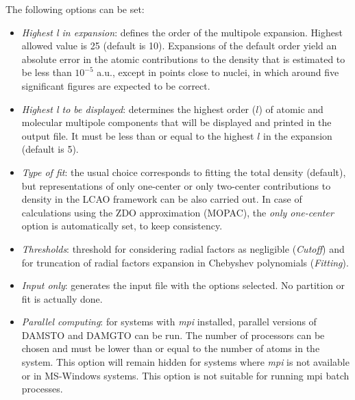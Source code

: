 \documentclass[10pt]{article}
\begin{document}
The following options can be
set:
\renewcommand{\labelitemi}{$-$}
\begin{itemize}
\item {\it Highest l in expansion}: defines the order of the multipole
expansion. Highest allowed value is 25 (default is 10). 
Expansions of the default order yield an absolute error in the atomic
contributions to the density that is estimated to be less than $10^{-5}$ a.u., except in points close
to nuclei, in which around five significant figures are expected to be correct.

\item {\it Highest l to be displayed}: determines the highest order ($l$) of atomic and molecular
multipole components that will be displayed and printed in the output file. It must
be less than or equal to the highest $l$ in the expansion (default is 5).

\item{\it Type of fit}: the usual choice 
corresponds to fitting the total
density (default), but representations of only one-center or only two-center
contributions to density in the LCAO framework can be also carried out. In case of 
calculations using the ZDO approximation (MOPAC), the {\it only one-center} option is
automatically set, to keep consistency.

\item{\it Thresholds}: threshold for considering
radial factors as negligible ({\it Cutoff}) and for truncation of radial factors 
expansion in Chebyshev polynomials ({\it Fitting}).

\item{\it Input only}: generates the input file 
with the options selected. No partition or fit is actually done.

\item{\it Parallel computing}: for systems 
with {\it mpi} installed, parallel
versions of DAMSTO and DAMGTO can be run. The number of processors can be chosen
and must be lower than or equal to the number of atoms in
the system. This option will remain hidden for systems where {\it mpi} is not
available or in MS-Windows systems. This option is not suitable for running mpi 
batch processes.
\end{itemize}
\end{document}
